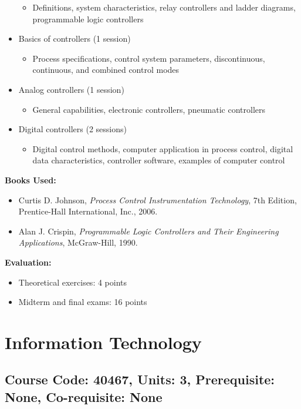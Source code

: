 \documentclass[12pt]{article}
\begin{document}
\begin{itemize}
    \begin{itemize}
        \item Definitions, system characteristics, relay controllers and ladder diagrams, programmable logic controllers
    \end{itemize}
    \item Basics of controllers (1 session)
    \begin{itemize}
        \item Process specifications, control system parameters, discontinuous, continuous, and combined control modes
    \end{itemize}
    \item Analog controllers (1 session)
    \begin{itemize}
        \item General capabilities, electronic controllers, pneumatic controllers
    \end{itemize}
    \item Digital controllers (2 sessions)
    \begin{itemize}
        \item Digital control methods, computer application in process control, digital data characteristics, controller software, examples of computer control
    \end{itemize}
\end{itemize}

\textbf{Books Used:}
\begin{itemize}
    \item Curtis D. Johnson, \textit{Process Control Instrumentation Technology}, 7th Edition, Prentice-Hall International, Inc., 2006.
    \item Alan J. Crispin, \textit{Programmable Logic Controllers and Their Engineering Applications}, McGraw-Hill, 1990.
\end{itemize}

\textbf{Evaluation:}
\begin{itemize}
    \item Theoretical exercises: 4 points
    \item Midterm and final exams: 16 points
\end{itemize}

\newpage

\section{Information Technology}
\subsection*{Course Code: 40467, Units: 3, Prerequisite: None, Co-requisite: None}
\end{document}
